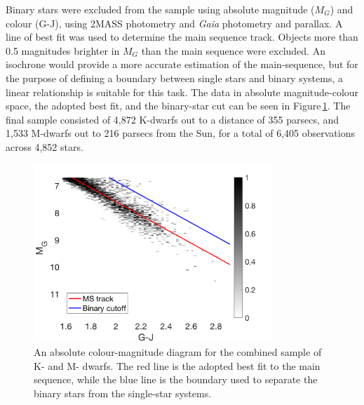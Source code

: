 Binary stars were excluded from the sample using absolute magnitude ($M_G$) and colour (G-J), using 2MASS photometry and \textit{Gaia} photometry and parallax. A line of best fit was used to determine the main sequence track. Objects more than 0.5 magnitudes brighter in $M_G$ than the main sequence were excluded. An isochrone would provide a more accurate estimation of the main-sequence, but for the purpose of defining a boundary between single stars and binary systems, a linear relationship is suitable for this task. The data in absolute magnitude-colour space, the adopted best fit, and the binary-star cut can be seen in Figure\,\ref{figGALAHbinary}. The final sample consisted of 4,872 K-dwarfs out to a distance of 355 parsecs, and 1,533 M-dwarfs out to 216 parsecs from the Sun, for a total of 6,405 observations across 4,852 stars.\\

\begin{figure}
    \centering
    \captionsetup{width=.8\textwidth}
    \includegraphics[width=0.8\textwidth]{Abs.png}
    \caption{An absolute colour-magnitude diagram for the combined sample of K- and M- dwarfs. The red line is the adopted best fit to the main sequence, while the blue line is the boundary used to separate the binary stars from the single-star systems.}
    \label{figGALAHbinary}
\end{figure}

